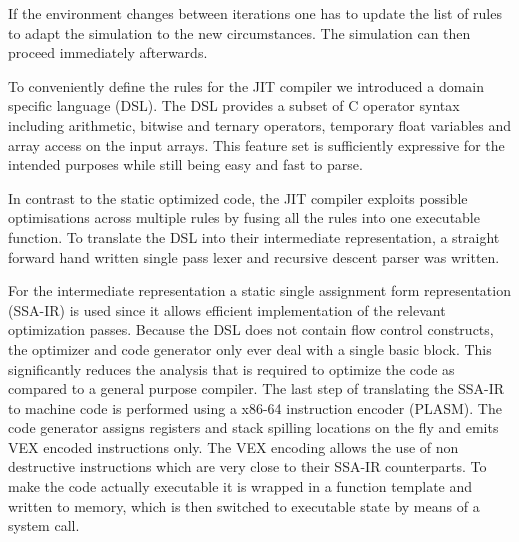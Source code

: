 If the environment changes between iterations one has to update the list of rules to adapt the simulation to the new circumstances.
The simulation can then proceed immediately afterwards.

To conveniently define the rules for the JIT compiler we introduced a domain specific language (DSL). The DSL provides a subset of C operator syntax including arithmetic, bitwise and ternary operators, temporary float variables and array access on the input arrays. This feature set is sufficiently expressive for the intended purposes while still being easy and fast to parse.

In contrast to the static optimized code, the JIT compiler exploits possible optimisations across multiple rules by fusing all the rules into one executable function. %
To translate the DSL into their intermediate representation, a straight forward hand written single pass lexer and recursive descent parser was written. %

For the intermediate representation a static single assignment form representation (SSA-IR)\cite[Chapter~6.2.4]{dragon}\cite{LuaJITir} is used since it allows efficient implementation of the relevant optimization passes. Because the DSL does not contain flow control constructs, the optimizer and code generator only ever deal with a single basic block. This significantly reduces the analysis that is required to optimize the code as compared to a general purpose compiler. The last step of translating the SSA-IR to machine code is performed using a x86-64 instruction encoder (PLASM). The code generator assigns registers and stack spilling locations on the fly and emits VEX encoded instructions only. The VEX encoding allows the use of non destructive instructions which are very close to their SSA-IR counterparts. To make the code actually executable it is wrapped in a function template and written to memory, which is then switched to executable state by means of a system call.


